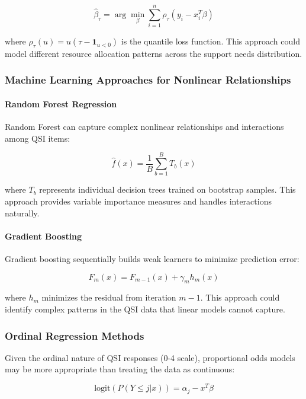 \documentclass[12pt]{article}
\begin{document}
\begin{equation}
\hat{\beta}_\tau = \arg\min_{\beta} \sum_{i=1}^n \rho_\tau(y_i - x_i^T\beta)
\end{equation}

where $\rho_\tau(u) = u(\tau - \mathbf{1}_{u<0})$ is the quantile loss function. This approach could model different resource allocation patterns across the support needs distribution.

\subsubsection{Machine Learning Approaches for Nonlinear Relationships}

\paragraph{Random Forest Regression}
Random Forest can capture complex nonlinear relationships and interactions among QSI items:

\begin{equation}
\hat{f}(x) = \frac{1}{B}\sum_{b=1}^B T_b(x)
\end{equation}

where $T_b$ represents individual decision trees trained on bootstrap samples. This approach provides variable importance measures and handles interactions naturally.

\paragraph{Gradient Boosting}
Gradient boosting sequentially builds weak learners to minimize prediction error:

\begin{equation}
F_m(x) = F_{m-1}(x) + \gamma_m h_m(x)
\end{equation}

where $h_m$ minimizes the residual from iteration $m-1$. This approach could identify complex patterns in the QSI data that linear models cannot capture.

\subsubsection{Ordinal Regression Methods}

Given the ordinal nature of QSI responses (0-4 scale), proportional odds models may be more appropriate than treating the data as continuous:

\begin{equation}
\text{logit}(P(Y \leq j|x)) = \alpha_j - x^T\beta
\end{equation}
\end{document}
